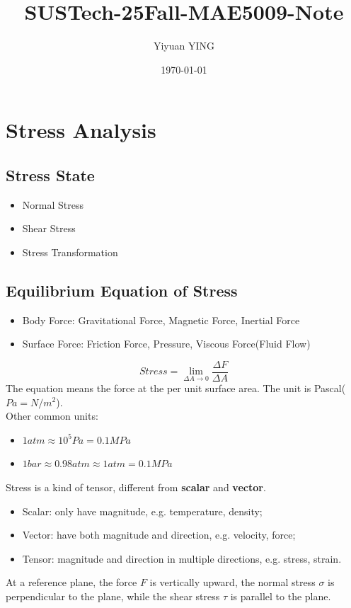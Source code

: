 \documentclass[en,hazy,cyan,8pt,normal]{elegantnote}
\title{SUSTech-25Fall-MAE5009-Note}
\author{Yiyuan YING}
\institute{Southern University of Science and Technology}
\date{\today}
\begin{document}
\maketitle

\section{Stress Analysis}
  \subsection{Stress State}
    \begin{itemize}
      \item Normal Stress
      \item Shear Stress
      \item Stress Transformation
    \end{itemize}

  \subsection{Equilibrium Equation of Stress}
    \begin{itemize}
      \item Body Force: Gravitational Force, Magnetic Force, Inertial Force
      \item Surface Force: Friction Force, Pressure, Viscous Force(Fluid Flow)
    \end{itemize}
    \begin{equation}\label{eq:001}
      Stress=\lim_{\Delta A \to 0} \frac{\Delta F}{\Delta A}
    \end{equation}
    The equation means the force at the per unit surface area. The unit is Pascal($Pa=N/m^2$).\\
    Other common units:
    \begin{itemize}
      \item $1 atm \approx 10^5 Pa = 0.1 MPa$
      \item $1 bar \approx 0.98 atm \approx 1 atm = 0.1 MPa$
    \end{itemize}
    Stress is a kind of tensor, different from \textbf{scalar} and \textbf{vector}.
    \begin{itemize}
      \item Scalar: only have magnitude, e.g. temperature, density;
      \item Vector: have both magnitude and direction, e.g. velocity, force;
      \item Tensor: magnitude and direction in multiple directions, e.g. stress, strain.
    \end{itemize}
    At a reference plane, the force $F$ is vertically upward, the normal stress $\sigma$ is perpendicular to the plane, while the shear stress $\tau$ is parallel to the plane.\\
\end{document}
